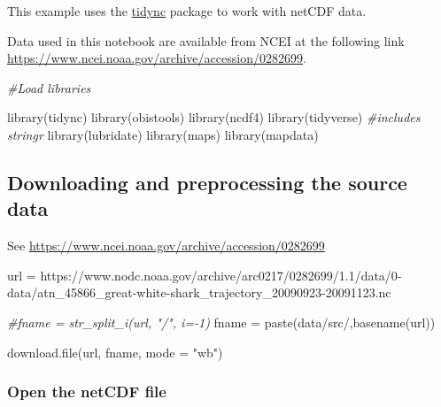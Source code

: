 \documentclass[
]{book}
\newenvironment{Shaded}{\begin{snugshade}}{\end{snugshade}}
\newcommand{\AttributeTok}[1]{\textcolor[rgb]{0.77,0.63,0.00}{#1}}
\newcommand{\CommentTok}[1]{\textcolor[rgb]{0.56,0.35,0.01}{\textit{#1}}}
\newcommand{\FunctionTok}[1]{\textcolor[rgb]{0.00,0.00,0.00}{#1}}
\newcommand{\NormalTok}[1]{#1}
\newcommand{\OtherTok}[1]{\textcolor[rgb]{0.56,0.35,0.01}{#1}}
\newcommand{\StringTok}[1]{\textcolor[rgb]{0.31,0.60,0.02}{#1}}
\begin{document}
This example uses the \href{https://ropensci.org/blog/2019/11/05/tidync/}{tidync} package to work with netCDF data.

Data used in this notebook are available from NCEI at the following link \url{https://www.ncei.noaa.gov/archive/accession/0282699}.

\begin{Shaded}
\begin{Highlighting}[]
\CommentTok{\#Load libraries}

\FunctionTok{library}\NormalTok{(tidync)}
\FunctionTok{library}\NormalTok{(obistools)}
\FunctionTok{library}\NormalTok{(ncdf4)}
\FunctionTok{library}\NormalTok{(tidyverse) }\CommentTok{\#includes stringr}
\FunctionTok{library}\NormalTok{(lubridate)}
\FunctionTok{library}\NormalTok{(maps)}
\FunctionTok{library}\NormalTok{(mapdata)}
\end{Highlighting}
\end{Shaded}

\hypertarget{downloading-and-preprocessing-the-source-data}{%
\subsection{Downloading and preprocessing the source data}\label{downloading-and-preprocessing-the-source-data}}

See \url{https://www.ncei.noaa.gov/archive/accession/0282699}

\begin{Shaded}
\begin{Highlighting}[]
\NormalTok{url }\OtherTok{=} \StringTok{\textquotesingle{}https://www.nodc.noaa.gov/archive/arc0217/0282699/1.1/data/0{-}data/atn\_45866\_great{-}white{-}shark\_trajectory\_20090923{-}20091123.nc\textquotesingle{}}

\CommentTok{\#fname = str\_split\_i(url, "/", i={-}1)}
\NormalTok{fname }\OtherTok{=} \FunctionTok{paste}\NormalTok{(}\StringTok{\textquotesingle{}data/src/\textquotesingle{}}\NormalTok{,}\FunctionTok{basename}\NormalTok{(url))}

\FunctionTok{download.file}\NormalTok{(url, fname, }\AttributeTok{mode =} \StringTok{"wb"}\NormalTok{)}
\end{Highlighting}
\end{Shaded}

\hypertarget{open-the-netcdf-file}{%
\subsubsection{Open the netCDF file}\label{open-the-netcdf-file}}
\end{document}
